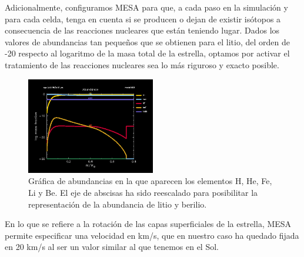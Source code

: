 Adicionalmente, configuramos MESA para que, a cada paso en la simulación y para cada celda, tenga en cuenta si se producen o dejan de existir isótopos a consecuencia de las reacciones nucleares que están teniendo lugar. Dados los valores de abundancias tan pequeños que se obtienen para el litio, del orden de -20 respecto al logaritmo de la masa total de la estrella, optamos por activar el tratamiento de las reacciones nucleares sea lo más riguroso y exacto posible.\par

\begin{figure}
	\centering
	\includegraphics[width=0.5\textwidth]{img/tesis/abundances.pdf}
	\caption {Gráfica de abundancias en la que aparecen los elementos H, He, Fe, Li y Be. El eje de abscisas ha sido reescalado para posibilitar la representación de la abundancia de litio y berilio.}
	\label{fig:abundances}
\end{figure}


En lo que se refiere a la rotación de las capas superficiales de la estrella, MESA permite especificar una velocidad en km/s, que en nuestro caso ha quedado fijada en 20 km/s al ser un valor similar al que tenemos en el Sol.\par

